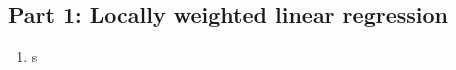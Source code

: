 \documentclass[]{book}
\theoremstyle{definition}
\begin{document}
\subsection*{Part 1: Locally weighted linear regression}

\begin{enumerate}
	\item s
\end{enumerate}
\end{document}
